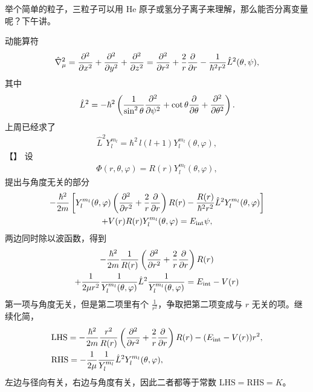 举个简单的粒子，三粒子可以用 He 原子或氢分子离子来理解，那么能否分离变量呢？下午讲。

动能算符
\begin{align}
     \hat \nabla^2_\mu = \pdv[2]x + \pdv[2]y + \pdv[2]z = \pdv[2]r + \frac2r \pdv{r} - \frac1{\hbar^2r^2} \hat L^2 (\theta, \psi), 
\end{align}
其中
\begin{align}
    \hat L^2 = -\hbar^2 \left(
        \frac1{\sin^2\theta} \pdv[2]{\psi} + \cot\theta \pdv{\theta} + \pdv[2]\theta
    \right). 
\end{align}
上周已经求了
\begin{align}
    \hat L^2 Y_l^{m_l} = \hbar^2 \,l(l+1) Y_l^{m_l}(\theta,\varphi), 
\end{align}
【】
设
\begin{align}
    \Phi(r,\theta,\varphi) = R(r) Y_l^{m_l} (\theta,\varphi),
\end{align}
提出与角度无关的部分
\begin{multline}
    -\frac{\hbar^2}{2m} 
    \left[
    Y_l^{m_l} (\theta,\varphi) \left(\pdv[2]r + \frac2r \pdv{r}\right) R(r) - \frac{R(r)}{\hbar^2r^2} \hat L^2 Y_l^{m_l} (\theta,\varphi)
    \right] \\
    + V(r) R(r) Y_l^{m_l} (\theta, \varphi) = E_{\mathrm {int}}\psi,
\end{multline}
两边同时除以波函数，得到
\begin{multline}
    -\frac{\hbar^2}{2m} \frac1{R(r)} 
    \left(\pdv[2]r + \frac2r \pdv{r}\right) R(r)  \\ + \frac1{2\mu r^2} \frac1{Y_l^{m_l}(\theta,\varphi)} \hat L^2 \frac1{Y_l^{m_l}(\theta,\varphi)}  = E_{\mathrm{int}} - V(r)
\end{multline}
第一项与角度无关，但是第二项里有个 $\frac1{r^2}$，争取把第二项变成与 $r$ 无关的项。继续化简，
\begin{align}
    &\text{LHS} = -\frac{\hbar^2}{2m} \frac{r^2}{R(r)} 
    \left(\pdv[2]r + \frac2r \pdv{r}\right) R(r) - (E_{\mathrm{int}} - V(r)) r^2, \\
    &\text{RHS} = -\frac1{2\mu} \frac1{Y_l^{m_l}} \hat L^2 Y_l^{m_l}(\theta,\varphi),
\end{align}
左边与径向有关，右边与角度有关，因此二者都等于常数 $\text{LHS} = \text{RHS} = K$。

